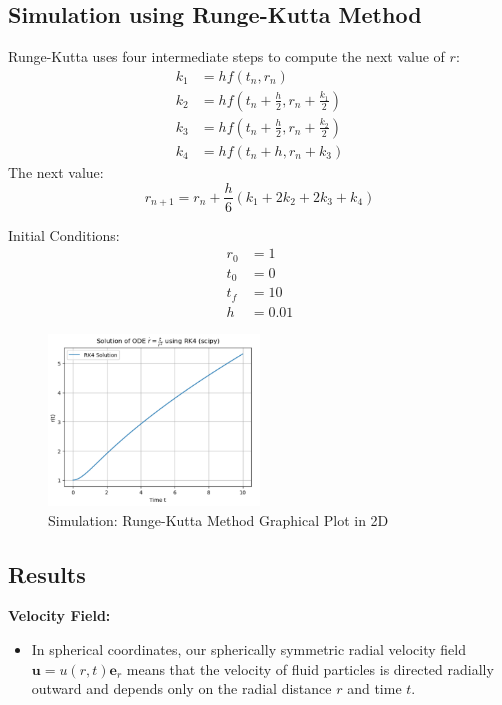 \documentclass{article}
\begin{document}
\subsection{Simulation using Runge-Kutta Method}
Runge-Kutta uses four intermediate steps to compute the next value of \(r\):
\begin{align}
k_1 &= h f(t_n, r_n) \\
k_2 &= h f\left(t_n + \frac{h}{2}, r_n + \frac{k_1}{2}\right) \\
k_3 &= h f\left(t_n + \frac{h}{2}, r_n + \frac{k_2}{2}\right) \\
k_4 &= h f(t_n + h, r_n + k_3)
\end{align}
The next value:
\begin{equation}
r_{n+1} = r_n + \frac{h}{6} (k_1 + 2k_2 + 2k_3 + k_4)
\end{equation}

Initial Conditions:
\begin{align*}
r_0 &= 1 \\
t_0 &= 0 \\
t_f &= 10 \\
h &= 0.01
\end{align*}

\begin{figure}[H]
    \centering
    \includegraphics[width=0.5\textwidth]{./src/figures/runge_kutta_method.PNG} 
    \caption{Simulation: Runge-Kutta Method Graphical Plot in 2D}
    \label{fig:runge_kutta_2d_plot}
\end{figure}

\subsection{Results}

\textbf{Velocity Field:}
\begin{itemize}
    \item In spherical coordinates, our spherically symmetric radial velocity field \( \mathbf{u} = u(r, t)\mathbf{e}_r \) means that the velocity of fluid particles is directed radially outward and depends only on the radial distance \( r \) and time \( t \).
\end{itemize}
\end{document}
